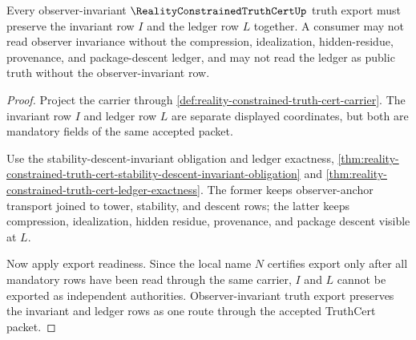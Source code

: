 \begin{theorem}
\label{thm:reality-constrained-truth-cert-observer-invariant-ledger-route}
Every observer-invariant $\RealityConstrainedTruthCertUp$ truth export must preserve the invariant row $I$ and the ledger row $L$ together. A consumer may not read observer invariance without the compression, idealization, hidden-residue, provenance, and package-descent ledger, and may not read the ledger as public truth without the observer-invariant row.
\end{theorem}
\begin{proof}
Project the carrier through \autoref{def:reality-constrained-truth-cert-carrier}. The invariant row $I$ and ledger row $L$ are separate displayed coordinates, but both are mandatory fields of the same accepted packet.

Use the stability-descent-invariant obligation and ledger exactness, \autoref{thm:reality-constrained-truth-cert-stability-descent-invariant-obligation} and \autoref{thm:reality-constrained-truth-cert-ledger-exactness}. The former keeps observer-anchor transport joined to tower, stability, and descent rows; the latter keeps compression, idealization, hidden residue, provenance, and package descent visible at $L$.

Now apply export readiness. Since the local name $N$ certifies export only after all mandatory rows have been read through the same carrier, $I$ and $L$ cannot be exported as independent authorities. Observer-invariant truth export preserves the invariant and ledger rows as one route through the accepted TruthCert packet.
\end{proof}
